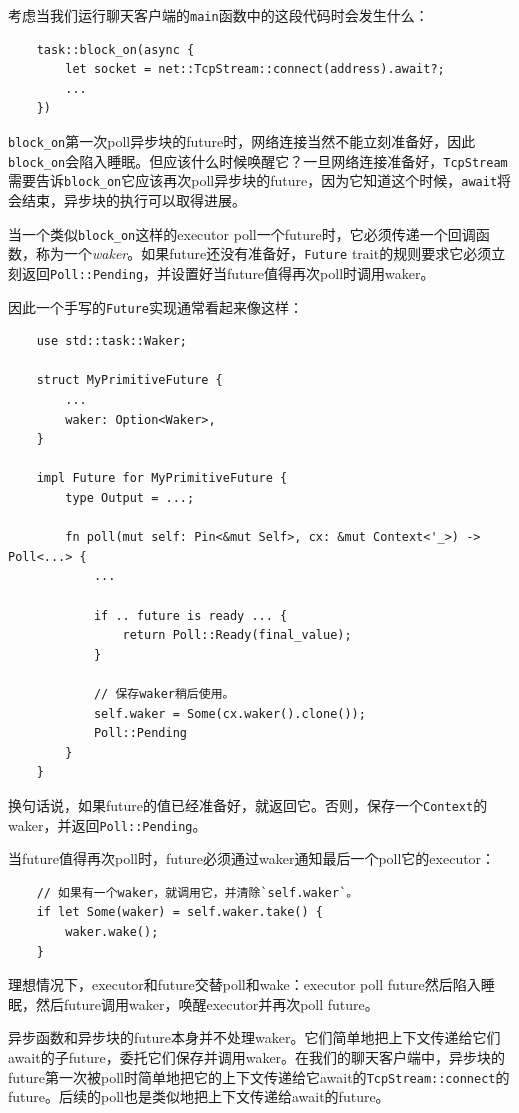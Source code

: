 考虑当我们运行聊天客户端的\texttt{main}函数中的这段代码时会发生什么：
\begin{verbatim}
    task::block_on(async {
        let socket = net::TcpStream::connect(address).await?;
        ...
    })
\end{verbatim}

\texttt{block\_on}第一次poll异步块的future时，网络连接当然不能立刻准备好，因此\texttt{block\_on}会陷入睡眠。但应该什么时候唤醒它？一旦网络连接准备好，\texttt{TcpStream}需要告诉\texttt{block\_on}它应该再次poll异步块的future，因为它知道这个时候，\texttt{await}将会结束，异步块的执行可以取得进展。

当一个类似\texttt{block\_on}这样的executor poll一个future时，它必须传递一个回调函数，称为一个\emph{waker}。如果future还没有准备好，\texttt{Future} trait的规则要求它必须立刻返回\texttt{Poll::Pending}，并设置好当future值得再次poll时调用waker。

因此一个手写的\texttt{Future}实现通常看起来像这样：
\begin{verbatim}
    use std::task::Waker;

    struct MyPrimitiveFuture {
        ...
        waker: Option<Waker>,
    }

    impl Future for MyPrimitiveFuture {
        type Output = ...;

        fn poll(mut self: Pin<&mut Self>, cx: &mut Context<'_>) -> Poll<...> {
            ...

            if .. future is ready ... {
                return Poll::Ready(final_value);
            }

            // 保存waker稍后使用。
            self.waker = Some(cx.waker().clone());
            Poll::Pending
        }
    }
\end{verbatim}

换句话说，如果future的值已经准备好，就返回它。否则，保存一个\texttt{Context}的waker，并返回\texttt{Poll::Pending}。

当future值得再次poll时，future必须通过waker通知最后一个poll它的executor：
\begin{verbatim}
    // 如果有一个waker，就调用它，并清除`self.waker`。
    if let Some(waker) = self.waker.take() {
        waker.wake();
    }
\end{verbatim}

理想情况下，executor和future交替poll和wake：executor poll future然后陷入睡眠，然后future调用waker，唤醒executor并再次poll future。

异步函数和异步块的future本身并不处理waker。它们简单地把上下文传递给它们await的子future，委托它们保存并调用waker。在我们的聊天客户端中，异步块的future第一次被poll时简单地把它的上下文传递给它await的\texttt{TcpStream::connect}的future。后续的poll也是类似地把上下文传递给await的future。

